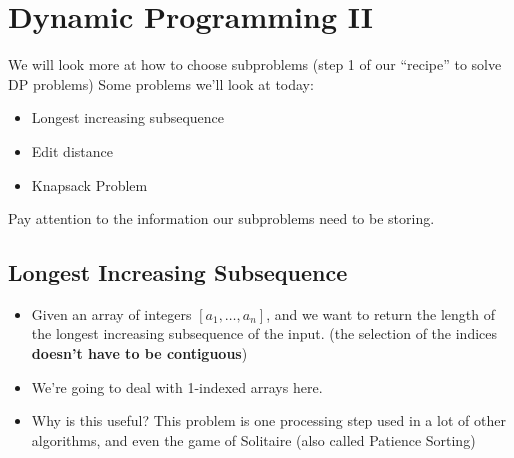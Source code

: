 \section{Dynamic Programming II}
	We will look more at how to choose subproblems (step 1 of our ``recipe'' to solve DP problems)
	Some problems we'll look at today:
	\begin{itemize}
		\item Longest increasing subsequence
		\item Edit distance
		\item Knapsack Problem
	\end{itemize}
	Pay attention to the information our subproblems need to be storing. 

	\subsection{Longest Increasing Subsequence}
	\begin{itemize}
		\item Given an array of integers $\left[ a_1, \dots, a_n \right]$, and we want to return the length 
			of the longest increasing subsequence of the input. (the selection of the indices \textbf{doesn't 
			have to be contiguous})
		\item We're going to deal with 1-indexed arrays here. 
		\item Why is this useful? This problem is one processing step used in a lot of other algorithms, 
			and even the game of Solitaire (also called Patience Sorting)
	\end{itemize}
